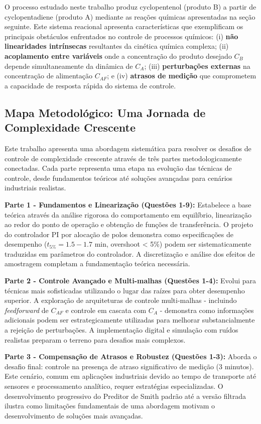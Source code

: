 \documentclass[a4paper,12pt]{article}
\begin{document}
O processo estudado neste trabalho produz cyclopentenol (produto B) a partir de cyclopentadiene (produto A) mediante as reações químicas apresentadas na seção seguinte. Este sistema reacional apresenta características que exemplificam os principais obstáculos enfrentados no controle de processos químicos: (i) \textbf{não linearidades intrínsecas} resultantes da cinética química complexa; (ii) \textbf{acoplamento entre variáveis} onde a concentração do produto desejado $C_B$ depende simultaneamente da dinâmica de $C_A$; (iii) \textbf{perturbações externas} na concentração de alimentação $C_{AF}$; e (iv) \textbf{atrasos de medição} que comprometem a capacidade de resposta rápida do sistema de controle.

\subsection{Mapa Metodológico: Uma Jornada de Complexidade Crescente}

Este trabalho apresenta uma abordagem sistemática para resolver os desafios de controle de complexidade crescente através de três partes metodologicamente conectadas. Cada parte representa uma etapa na evolução das técnicas de controle, desde fundamentos teóricos até soluções avançadas para cenários industriais realistas.

\textbf{Parte 1 - Fundamentos e Linearização (Questões 1-9):}
Estabelece a base teórica através da análise rigorosa do comportamento em equilíbrio, linearização ao redor do ponto de operação e obtenção de funções de transferência. O projeto do controlador PI por alocação de polos demonstra como especificações de desempenho ($t_{5\%} = 1.5-1.7$ min, overshoot < 5\%) podem ser sistematicamente traduzidas em parâmetros do controlador. A discretização e análise dos efeitos de amostragem completam a fundamentação teórica necessária.

\textbf{Parte 2 - Controle Avançado e Multi-malhas (Questões 1-4):}
Evolui para técnicas mais sofisticadas utilizando o lugar das raízes para obter desempenho superior. A exploração de arquiteturas de controle multi-malhas - incluindo \textit{feedforward} de $C_{AF}$ e controle em cascata com $C_A$ - demonstra como informações adicionais podem ser estrategicamente utilizadas para melhorar substancialmente a rejeição de perturbações. A implementação digital e simulação com ruídos realistas preparam o terreno para desafios mais complexos.

\textbf{Parte 3 - Compensação de Atrasos e Robustez (Questões 1-3):}
Aborda o desafio final: controle na presença de atraso significativo de medição (3 minutos). Este cenário, comum em aplicações industriais devido ao tempo de transporte até sensores e processamento analítico, requer estratégias especializadas. O desenvolvimento progressivo do Preditor de Smith padrão até a versão filtrada ilustra como limitações fundamentais de uma abordagem motivam o desenvolvimento de soluções mais avançadas.
\end{document}
